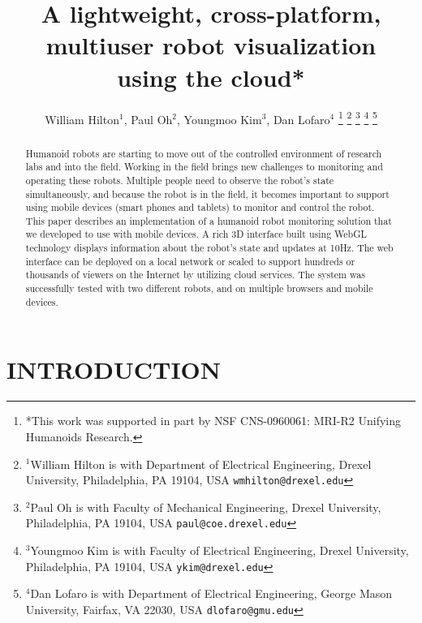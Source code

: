 \documentclass[letterpaper, 10 pt, conference]{ieee/ieeeconf}  %
\title{\LARGE \bf
A lightweight, cross-platform, multiuser robot visualization \\ using the cloud*
}
\author{William Hilton$^{1}$, Paul Oh$^{2}$, Youngmoo Kim$^{3}$, Dan Lofaro$^{4}$%
\thanks{*This work was supported in part by NSF CNS-0960061: MRI-R2 Unifying Humanoids Research.}%
\thanks{$^{1}$William Hilton is with Department of Electrical Engineering, Drexel University,
        Philadelphia, PA 19104, USA
        {\tt\small wmhilton@drexel.edu}}%
\thanks{$^{2}$Paul Oh is with Faculty of Mechanical Engineering, Drexel University,
        Philadelphia, PA 19104, USA
        {\tt\small paul@coe.drexel.edu}}%
\thanks{$^{3}$Youngmoo Kim is with Faculty of Electrical Engineering, Drexel University,
        Philadelphia, PA 19104, USA
        {\tt\small ykim@drexel.edu}}%
\thanks{$^{4}$Dan Lofaro is with Department of Electrical Engineering, George Mason University,
        Fairfax, VA 22030, USA
        {\tt\small dlofaro@gmu.edu}}%
}
\begin{document}
\maketitle
\thispagestyle{empty}
\pagestyle{empty}








\begin{abstract}
Humanoid robots are starting to move out of the controlled environment of research labs and into the field. 
Working in the field brings new challenges to monitoring and operating these robots.
Multiple people need to observe the robot's state simultaneously, and because the robot is in the field, it becomes important to support using mobile devices (smart phones and tablets) to monitor and control the robot.
This paper describes an implementation of a humanoid robot monitoring solution that we developed to use with mobile devices.
A rich 3D interface built using WebGL technology displays information about the robot's state and updates at 10Hz.
The web interface can be deployed on a local network or scaled to support hundreds or thousands of viewers on the Internet by utilizing cloud services.
The system was successfully tested with two different robots, and on multiple browsers and mobile devices.
\end{abstract}


\section{INTRODUCTION}
\end{document}

